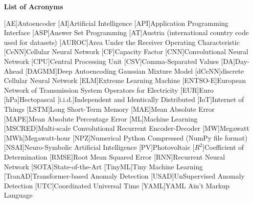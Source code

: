 \newpage
\vspace*{2.2 cm}
\Large
\noindent
{\bf List of Acronyms} \\
\vspace*{0.7 cm}
\normalsize

\begin{acronym}
	[AE]{Autoencoder}
	[AI]{Artificial Intelligence}
	[API]{Application Programming Interface}
	[ASP]{Answer Set Programming}
	[AT]{Austria (international country code used for datasets)}
	[AUROC]{Area Under the Receiver Operating Characteristic}
	[CeNN]{Cellular Neural Network}
	[CF]{Capacity Factor}
	[CNN]{Convolutional Neural Network}
	[CPU]{Central Processing Unit}
	[CSV]{Comma-Separated Values}
	[DA]{Day-Ahead}
	[DAGMM]{Deep Autoencoding Gaussian Mixture Model}
	[dCeNN]{discrete Cellular Neural Network}
	[ELM]{Extreme Learning Machine}
	[ENTSO-E]{European Network of Transmission System Operators for Electricity}
	[EUR]{Euro}
	[hPa]{Hectopascal}
	[i.i.d.]{Independent and Identically Distributed}
	[IoT]{Internet of Things}
	[LSTM]{Long Short-Term Memory}
	[MAE]{Mean Absolute Error}
	[MAPE]{Mean Absolute Percentage Error}
	[ML]{Machine Learning}
	[MSCRED]{Multi-scale Convolutional Recurrent Encoder-Decoder}
	[MW]{Megawatt}
	[MWh]{Megawatt-hour}
	[NPZ]{Numerical Python Compressed (NumPy file format)}
	[NSAI]{Neuro-Symbolic Artificial Intelligence}
	[PV]{Photovoltaic}
	[$R^2$]{Coefficient of Determination}
	[RMSE]{Root Mean Squared Error}
	[RNN]{Recurrent Neural Network}
	[SOTA]{State-of-the-Art}
	[TinyML]{Tiny Machine Learning}
	[TranAD]{Transformer-based Anomaly Detection}
	[USAD]{UnSupervised Anomaly Detection}
	[UTC]{Coordinated Universal Time}
	[YAML]{YAML Ain't Markup Language}
\end{acronym}

\afterpage{\blankpage}